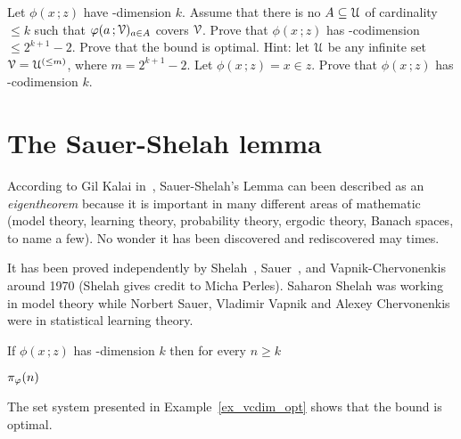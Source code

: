 \documentclass[scombinatorics.tex]{subfiles}
\begin{document}
\begin{exercise}
  Let $\phi(x\,;z)$ have \vc-dimension $k$.
  Assume that there is no $A\subseteq\EuScript U$ of cardinality $\le k$ such that $\varphi(a\,;\EuScript V)_{a\in A}$ covers $\EuScript V$.
  Prove that $\phi(x\,;z)$ has \vc-codimension $\le2^{k+1}-2$.
  Prove that the bound is optimal.
  Hint: let $\EuScript U$ be any infinite set $\EuScript V=\EuScript U^{(\le m)}$, where $m=2^{k+1}-2$.
  Let $\phi(x\,;z)=x\in z$.
  Prove that $\phi(x\,;z)$ has \vc-codimension $k$.\QED
\end{exercise}


  


\section{The Sauer-Shelah lemma}\label{sauer}

\def\ceq#1#2#3{\parbox[t]{15ex}{$\displaystyle #1$}\medrel{#2}{$\displaystyle #3$}}

According to Gil Kalai in~\cite{kalai}, Sauer-Shelah's Lemma can been described as an \textit{eigentheorem\/} because it is important in many different areas of mathematic (model theory, learning theory, probability theory, ergodic theory, Banach spaces, to name a few).
No wonder it has been discovered and rediscovered may times.

It has been proved independently by Shelah~\cite{shelah72}, Sauer~\cite{sauer}, and Vapnik-Cher\-vo\-nen\-kis~\cite{VC} around 1970 (Shelah gives credit to Micha Perles).
Saharon Shelah was working in model theory while Norbert Sauer, Vladimir Vapnik and Alexey Chervonenkis were in statistical learning theory.

\begin{void_thm}\label{lem_sauer}
If $\phi(x\,;z)$ has \vc-dimension $k$ then for every $n\ge k$

\ceq{\hfill\pi_\phi(n)}{\le}{\bigsum^{k}_{i=0} \binom{n}{i}.}\QED 
\end{void_thm}

The set system presented in Example~\ref{ex_vcdim_opt} shows that the bound is optimal.
\end{document}
